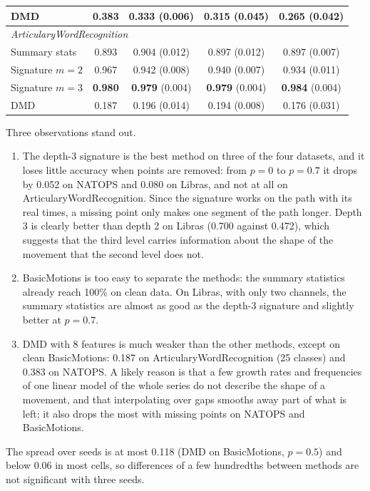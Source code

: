 \begin{table}[ht]
\begin{tabular}{lcccc}
DMD & 0.383 & 0.333 (0.006) & 0.315 (0.045) & 0.265 (0.042) \\
\midrule
\multicolumn{5}{l}{\emph{ArticularyWordRecognition}} \\
Summary stats & 0.893 & 0.904 (0.012) & 0.897 (0.012) & 0.897 (0.007) \\
Signature $m=2$ & 0.967 & 0.942 (0.008) & 0.940 (0.007) & 0.934 (0.011) \\
Signature $m=3$ & \textbf{0.980} & \textbf{0.979} (0.004) & \textbf{0.979} (0.004) & \textbf{0.984} (0.004) \\
DMD & 0.187 & 0.196 (0.014) & 0.194 (0.008) & 0.176 (0.031) \\
\bottomrule
\end{tabular}
\end{table}

Three observations stand out.
\begin{enumerate}
\item The depth-3 signature is the best method on three of the four
datasets, and it loses little accuracy when points are removed: from
$p = 0$ to $p = 0.7$ it drops by 0.052 on NATOPS and 0.080 on Libras, and
not at all on ArticularyWordRecognition. Since the signature works on the
path with its real times, a missing point only makes one segment of the
path longer. Depth 3 is clearly better than depth 2 on Libras (0.700
against 0.472), which suggests that the third level carries information
about the shape of the movement that the second level does not.
\item BasicMotions is too easy to separate the methods: the summary
statistics already reach 100\% on clean data. On Libras, with only two
channels, the summary statistics are almost as good as the depth-3
signature and slightly better at $p = 0.7$.
\item DMD with 8 features is much weaker than the other methods, except on
clean BasicMotions: 0.187 on ArticularyWordRecognition (25 classes) and 0.383 on
NATOPS. A likely reason is that a few growth rates and frequencies of one
linear model of the whole series do not describe the shape of a movement,
and that interpolating over gaps smooths away part of what is left; it
also drops the most with missing points on NATOPS and BasicMotions.
\end{enumerate}
The spread over seeds is at most 0.118 (DMD on BasicMotions, $p = 0.5$)
and below 0.06 in most cells, so differences of a few hundredths between
methods are not significant with three seeds.

